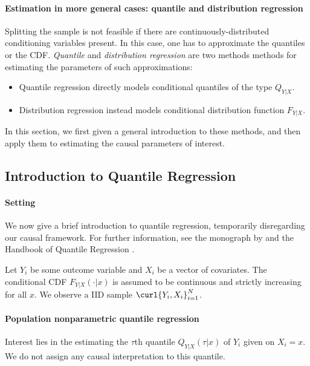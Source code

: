 \paragraph{Estimation in more general cases: quantile and distribution regression}

Splitting the sample is not feasible if there are continuously-distributed conditioning variables present.   In this case, one has to approximate the quantiles or the CDF. \emph{Quantile} and \emph{distribution regression} are two methods methods for estimating the parameters of such approximations:
\begin{itemize}
	\item Quantile regression directly models conditional quantiles of the type $Q_{Y|X}$.
	\item Distribution regression instead models conditional distribution function $F_{Y|X}$.
\end{itemize} 
In this section, we first given a general introduction to these methods, and then apply them to estimating the causal parameters of interest. 

\subsection{Introduction to Quantile Regression}



\paragraph{Setting}

We now give a brief introduction to quantile regression, temporarily disregarding our causal framework.  For further information, see the monograph by \cite{Koenker2005} and the Handbook of Quantile Regression \citep{Koenker2017HandbookQuantileRegression}.

Let $Y_i$ be some outcome variable and $X_i$ be a vector of covariates.  The conditional CDF $F_{Y|X}(\cdot|x)$ is assumed to be continuous and strictly increasing for all $x$. We observe a IID sample $\curl{Y_i, X_i}_{i=1}^N$. 
  
\paragraph{Population nonparametric quantile regression}


Interest lies in the estimating the $\tau$th quantile $Q_{Y|X}(\tau|x)$ of $Y_i$ given on $X_i=x$.  We do not assign any causal interpretation to this quantile.

